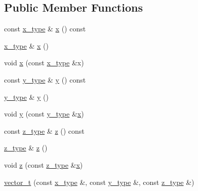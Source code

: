 \subsection*{Public Member Functions}
\begin{DoxyCompactItemize}
\item 
const \hyperlink{classvector__t_a3e09c311dbbdc507b68a2f3fa0c3d25b}{x\+\_\+type} \& \hyperlink{classvector__t_a2b3fbe3ac4e41a57bcd63384ac1cc45e}{x} () const 
\item 
\hyperlink{classvector__t_a3e09c311dbbdc507b68a2f3fa0c3d25b}{x\+\_\+type} \& \hyperlink{classvector__t_a5ad3ab9e562b1344f5f8b5a068b4f30a}{x} ()
\item 
void \hyperlink{classvector__t_aa5d1f1a560eee9010dbe365d0a9ec764}{x} (const \hyperlink{classvector__t_a3e09c311dbbdc507b68a2f3fa0c3d25b}{x\+\_\+type} \&x)
\item 
const \hyperlink{classvector__t_ab24cc76c51c8a32d39f97d1b4f8ddc5c}{y\+\_\+type} \& \hyperlink{classvector__t_a678cf006ff3923c69574fc026e497fa4}{y} () const 
\item 
\hyperlink{classvector__t_ab24cc76c51c8a32d39f97d1b4f8ddc5c}{y\+\_\+type} \& \hyperlink{classvector__t_a89e4eb27037aac5823bfcd3b83012325}{y} ()
\item 
void \hyperlink{classvector__t_a0d70c752be7e0a8a53c988f0a851606a}{y} (const \hyperlink{classvector__t_ab24cc76c51c8a32d39f97d1b4f8ddc5c}{y\+\_\+type} \&\hyperlink{classvector__t_a2b3fbe3ac4e41a57bcd63384ac1cc45e}{x})
\item 
const \hyperlink{classvector__t_a99f7b43996ec66480576ae8bd8d03cb6}{z\+\_\+type} \& \hyperlink{classvector__t_ade029a7db60c9da0414b0acc46bbc2f3}{z} () const 
\item 
\hyperlink{classvector__t_a99f7b43996ec66480576ae8bd8d03cb6}{z\+\_\+type} \& \hyperlink{classvector__t_a2e2e70752783b23ed256e8144705f72b}{z} ()
\item 
void \hyperlink{classvector__t_ada2f0998eccbb4e8731249bcbdaad273}{z} (const \hyperlink{classvector__t_a99f7b43996ec66480576ae8bd8d03cb6}{z\+\_\+type} \&\hyperlink{classvector__t_a2b3fbe3ac4e41a57bcd63384ac1cc45e}{x})
\item 
\hyperlink{classvector__t_abff727e8dc18463cffcca860c76e63c0}{vector\+\_\+t} (const \hyperlink{classvector__t_a3e09c311dbbdc507b68a2f3fa0c3d25b}{x\+\_\+type} \&, const \hyperlink{classvector__t_ab24cc76c51c8a32d39f97d1b4f8ddc5c}{y\+\_\+type} \&, const \hyperlink{classvector__t_a99f7b43996ec66480576ae8bd8d03cb6}{z\+\_\+type} \&)
\item 

\end{DoxyCompactItemize}
